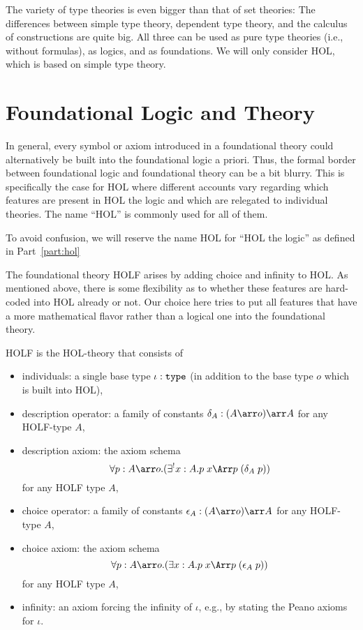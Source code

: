 The variety of type theories is even bigger than that of set theories: The differences between simple type theory, dependent type theory, and the calculus of constructions are quite big. All three can be used as pure type theories (i.e., without formulas), as logics, and as foundations. We will only consider HOL, which is based on simple type theory.

\section{Foundational Logic and Theory}

In general, every symbol or axiom introduced in a foundational theory could alternatively be built into the foundational logic a priori. Thus, the formal border between foundational logic and foundational theory can be a bit blurry. This is specifically the case for HOL where different accounts vary regarding which features are present in HOL the logic and which are relegated to individual theories. The name ``HOL'' is commonly used for all of them.

To avoid confusion, we will reserve the name HOL for ``HOL the logic'' as defined in Part~\ref{part:hol}

The foundational theory HOLF arises by adding choice and infinity to HOL. As mentioned above, there is some flexibility as to whether these features are hard-coded into HOL already or not. Our choice here tries to put all features that have a more mathematical flavor rather than a logical one into the foundational theory.

\begin{definition}
HOLF is the HOL-theory that consists of
\begin{itemize}
 \item individuals: a single base type $\iota:\mathtt{type}$ (in addition to the base type $o$ which is built into HOL),
 \item description operator: a family of constants $\delta_A:(A\arr o)\arr A$ for any HOLF-type $A$,
 \item description axiom: the axiom schema
  \[\forall p:A\arr o.(\exists^! x:A.p\; x \impl p\;(\delta_A\;p))\]
   for any HOLF type $A$,
 \item choice operator: a family of constants $\epsilon_A:(A\arr o)\arr A$ for any HOLF-type $A$,
 \item choice axiom: the axiom schema
  \[\forall p:A\arr o.(\exists x:A.p\; x \impl p\;(\epsilon_A\;p))\]
   for any HOLF type $A$,
 \item infinity: an axiom forcing the infinity of $\iota$, e.g., by stating the Peano axioms for $\iota$.
\end{itemize}
\end{definition}

